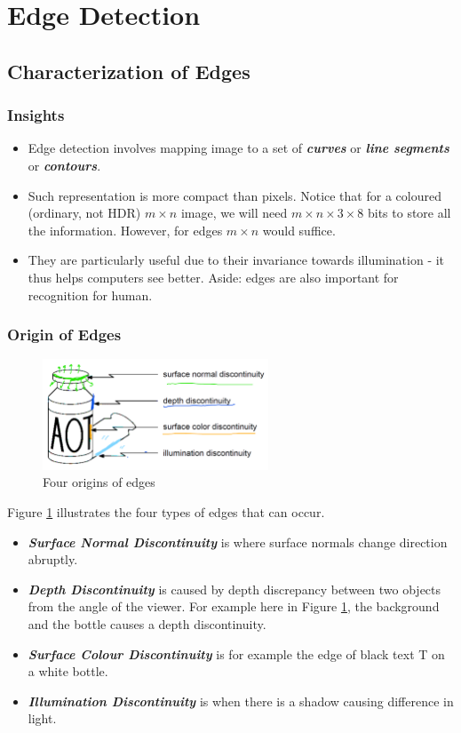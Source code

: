 \documentclass[11pt]{article}
\begin{document}
\section{Edge Detection}
\subsection{Characterization of Edges}
\subsubsection{Insights}
\begin{itemize}
	\item Edge detection involves mapping image to a set of \textit{\textbf{curves}} or \textit{\textbf{line segments}} or \textit{\textbf{contours}}.
	\item Such representation is more compact than pixels. Notice that for a coloured (ordinary, not HDR) $m \times n$ image, we will need $m \times n \times 3 \times 8$ bits to store all the information. However, for edges $m \times n$ would suffice. 
	\item They are particularly useful due to their invariance towards illumination - it thus helps computers see better. Aside: edges are also important for recognition for human. 
\end{itemize}

\subsubsection{Origin of Edges}
\begin{figure}[H]
\center\includegraphics[width=0.6\textwidth]{figs/edge_types.png}
\caption{Four origins of edges \label{fig:edge_types}}
\end{figure}
Figure \ref{fig:edge_types} illustrates the four types of edges that can occur. 
\begin{itemize}
\item \textit{\textbf{Surface Normal Discontinuity}} is where surface normals change direction abruptly. 
\item \textit{\textbf{Depth Discontinuity}} is caused by depth discrepancy between two objects from the angle of the viewer. For example here in Figure \ref{fig:edge_types}, the background and the bottle causes a depth discontinuity. 
\item \textit{\textbf{Surface Colour Discontinuity}} is for example the edge of black text T on a white bottle. 
\item \textit{\textbf{Illumination Discontinuity}} is when there is a shadow causing difference in light. 
\end{itemize}
\end{document}
